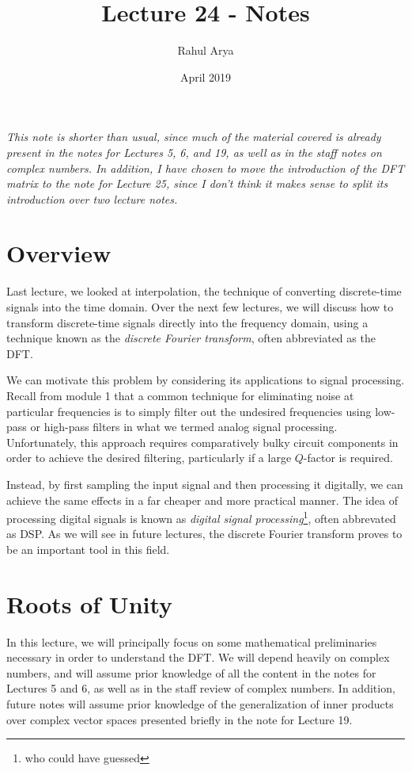 \documentclass[letterpaper]{article}
\title{Lecture 24 - Notes}
\author{Rahul Arya}
\date{April 2019}
\theoremstyle{remark}
\begin{document}
\maketitle

\emph{This note is shorter than usual, since much of the material covered is already present in the notes for Lectures 5, 6, and 19, as well as in the staff notes on complex numbers. In addition, I have chosen to move the introduction of the DFT matrix to the note for Lecture 25, since I don't think it makes sense to split its introduction over two lecture notes.}

\section{Overview}
Last lecture, we looked at interpolation, the technique of converting discrete-time signals into the time domain. Over the next few lectures, we will discuss how to transform discrete-time signals directly into the frequency domain, using a technique known as the \emph{discrete Fourier transform}, often abbreviated as the DFT.

We can motivate this problem by considering its applications to signal processing. Recall from module 1 that a common technique for eliminating noise at particular frequencies is to simply filter out the undesired frequencies using low-pass or high-pass filters in what we termed analog signal processing. Unfortunately, this approach requires comparatively bulky circuit components in order to achieve the desired filtering, particularly if a large $Q$-factor is required.

Instead, by first sampling the input signal and then processing it digitally, we can achieve the same effects in a far cheaper and more practical manner. The idea of processing digital signals is known as \emph{digital signal processing}\footnote{who could have guessed}, often abbrevated as DSP. As we will see in future lectures, the discrete Fourier transform proves to be an important tool in this field.

\section{Roots of Unity}
In this lecture, we will principally focus on some mathematical preliminaries necessary in order to understand the DFT. We will depend heavily on complex numbers, and will assume prior knowledge of all the content in the notes for Lectures 5 and 6, as well as in the staff review of complex numbers. In addition, future notes will assume prior knowledge of the generalization of inner products over complex vector spaces presented briefly in the note for Lecture 19.
\end{document}
